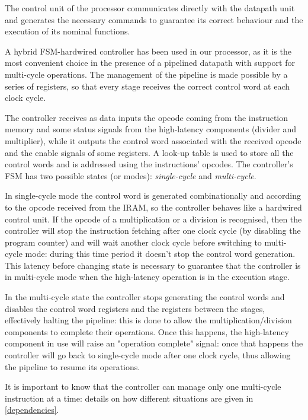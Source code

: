The control unit of the processor communicates directly with the datapath unit and generates the necessary commands to guarantee its correct behaviour and the execution of its nominal functions. 

A hybrid FSM-hardwired controller has been used in our processor, as it is the most convenient choice in the presence of a pipelined datapath with support for multi-cycle operations. 
The management of the pipeline is made possible by a series of registers, so that every stage receives the correct control word at each clock cycle.  

The controller receives as data inputs the opcode coming from the instruction memory and some status signals from the high-latency components (divider and multiplier), while it outputs the control word associated with the received opcode and the enable signals of some registers.
A look-up table is used to store all the control words and is addressed using the instructions' opcodes. 
The controller's FSM has two possible states (or modes): \textit{single-cycle} and \textit{multi-cycle}.

In single-cycle mode the control word is generated combinationally and according to the opcode received from the IRAM, so the controller behaves like a hardwired control unit. 
If the opcode of a multiplication or a division is recognised, then the controller will stop the instruction fetching after one clock cycle (by disabling the program counter) and will wait another clock cycle before switching to multi-cycle mode: during this time period it doesn't stop the control word generation.
This latency before changing state is necessary to guarantee that the controller is in multi-cycle mode when the high-latency operation is in the execution stage.

In the multi-cycle state the controller stops generating the control words and disables the control word registers and the registers between the stages, effectively halting the pipeline: this is done to allow the multiplication/division components to complete their operations.
Once this happens, the high-latency component in use will raise an "operation complete" signal: once that happens the controller will go back to single-cycle mode after one clock cycle, thus allowing the pipeline to resume its operations.

It is important to know that the controller can manage only one multi-cycle instruction at a time: details on how different situations are given in \autoref{dependencies}.